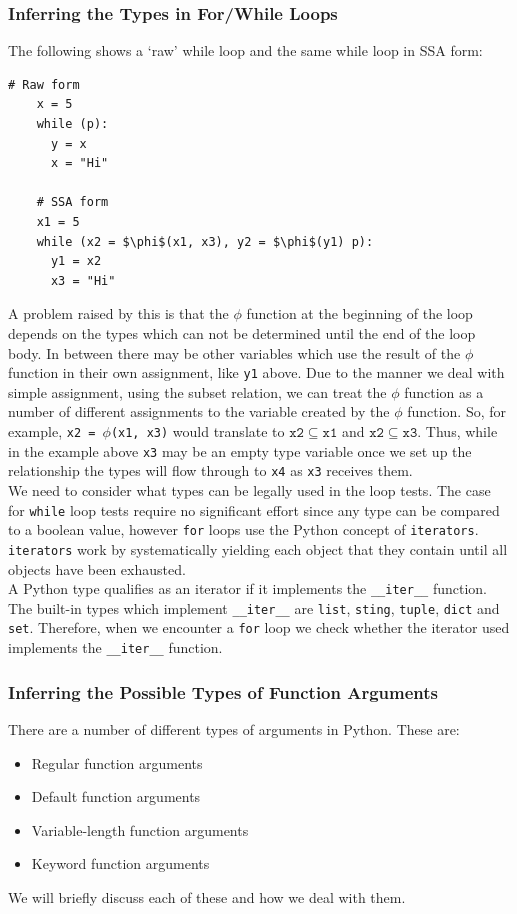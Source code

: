 \documentclass[12pt, titlepage]{article}
\begin{document}
\subsubsection{Inferring the Types in For/While Loops}
The following shows a `raw' while loop and the same while loop in SSA form:
\begin{lstlisting}[mathescape]
    # Raw form
    x = 5
    while (p):
      y = x
      x = "Hi"
	
    # SSA form
    x1 = 5
    while (x2 = $\phi$(x1, x3), y2 = $\phi$(y1) p):
      y1 = x2
      x3 = "Hi"
\end{lstlisting}
A problem raised by this is that the $\phi$ function at the beginning of the loop depends on the types which can not be determined until the end of the loop body. In between there may be other variables which use the result of the $\phi$ function in their own assignment, like \texttt{y1} above. Due to the manner we deal with simple assignment, using the subset relation, we can treat the $\phi$ function as a number of different assignments to the variable created by the $\phi$ function. So, for example, \texttt{x2 = $\phi$(x1, x3)} would translate to $\mathtt{x2 \subseteq x1}$ and $\mathtt{x2 \subseteq x3}$. Thus, while in the example above \texttt{x3} may be an empty type variable once we set up the relationship the types will flow through to \texttt{x4} as \texttt{x3} receives them. \\
\indent We need to consider what types can be legally used in the loop tests. The case for \texttt{while} loop tests require no significant effort since any type can be compared to a boolean value, however \texttt{for} loops use the Python concept of \texttt{iterators}. \texttt{iterators} work by systematically yielding each object that they contain until all objects have been exhausted. \\
\indent A Python type qualifies as an iterator if it implements the \texttt{\_\_iter\_\_} function. The built-in types which implement \texttt{\_\_iter\_\_} are \texttt{list}, \texttt{sting}, \texttt{tuple}, \texttt{dict} and \texttt{set}. Therefore, when we encounter a \texttt{for} loop we check whether the iterator used implements the \texttt{\_\_iter\_\_} function.


\subsubsection{Inferring the Possible Types of Function Arguments}
\label{chap:inferringFuncArgs}
There are a number of different types of arguments in Python. These are:
\begin{itemize}
	\item Regular function arguments
	\item Default function arguments
	\item Variable-length function arguments
	\item Keyword function arguments
\end{itemize}
We will briefly discuss each of these and how we deal with them.
\end{document}
